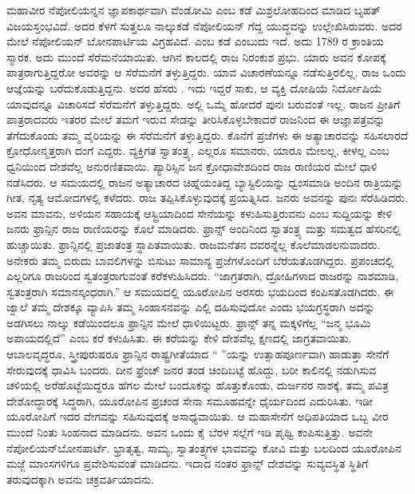 ಮಹಾವೀರ ನೆಪೋಲಿಯನ್ನನ ಜ್ಞಾಪಕಾರ್ಥವಾಗಿ ವೆಂಡೋಮಿ ಎಂಬ ಕಡೆ ಮಿಶ್ರ\break ಲೋಹದಿಂದ ಮಾಡಿದ ಬೃಹತ್​ ವಿಜಯಸ್ತಂಭವಿದೆ. ಅದರ ಕೆಳಗೆ ಸುತ್ತಲೂ ನಾಲ್ಕುಕಡೆ ನೆಪೋಲಿಯನ್​ ಗೆದ್ದ ಯುದ್ಧವನ್ನು ಉಲ್ಲೇಖಿಸಿರುವರು. ಅದರ ಮೇಲೆ ನೆಪೋಲಿಯನ್​ ಬೋನಪಾರ್ಟಿಯ ವಿಗ್ರಹವಿದೆ.  ಎಂಬ ಕಡೆ  ಎಂಬುದು ಇದೆ. ಅದು 1789 ರ ಕ್ರಾಂತಿಯ ಸ್ಮಾರಕ. ಅದು ಮುಂದೆ ಸೆರೆಮನೆಯಾಯಿತು. ಆಗಿನ ಕಾಲದಲ್ಲಿ ರಾಜ ನಿರಂಕುಶ ಪ್ರಭು. ಯಾರು ಅವನ ಕೋಪಕ್ಕೆ ಪಾತ್ರರಾಗುತ್ತಿದ್ದರೋ ಅವರನ್ನು ಆ ಸೆರೆಮನೆಗೆ ತಳ್ಳುತ್ತಿದ್ದರು. ಯಾವ ವಿಚಾರಣೆಯನ್ನೂ ನಡೆಸುತ್ತಿರಲಿಲ್ಲ. ರಾಜ ಒಂದು ಆಜ್ಞೆಯನ್ನು ಬರೆದುಕೊಡುತ್ತಿದ್ದನು. ಅದರ ಹೆಸರು . ಇದು ಇದ್ದರೆ ಸಾಕು, ಆ ವ್ಯಕ್ತಿ ದೋಷಿಯೆ ನಿರ್ದೋಷಿಯೆ ಯಾವುದನ್ನೂ ವಿಚಾರಿಸದೆ ಸೆರೆಮನೆಗೆ ತಳ್ಳುತ್ತಿದ್ದರು. ಅಲ್ಲಿ ಒಮ್ಮೆ ಹೋದರೆ ಪುನಃ ಬರುವಂತೆ ಇಲ್ಲ. ರಾಜನ ಪ್ರೀತಿಗೆ ಪಾತ್ರರಾದವರು ಇತರರ ಮೇಲೆ ತಮಗೆ ಇರುವ ಸೇಡನ್ನು ತೀರಿಸಿಕೊಳ್ಳಬೇಕಾದರೆ ರಾಜನಿಂದ ಈ ಆಜ್ಞಾಪತ್ರವನ್ನು ತೆಗೆದುಕೊಂಡು ತಮ್ಮ ವೈರಿಯನ್ನು ಈ ಸೆರೆಮನೆಗೆ ತಳ್ಳುತ್ತಿದ್ದರು. ಕೊನೆಗೆ ಪ್ರಜೆಗಳು ಈ ಅತ್ಯಾಚಾರವನ್ನು ಸಹಿಸಲಾರದೆ ಕ್ರೋಧೋನ್ಮತ್ತರಾಗಿ ದಂಗೆ ಎದ್ದರು. ವ್ಯಕ್ತಿಗತ ಸ್ವಾತಂತ್ರ್ಯ, ಎಲ್ಲರೂ ಸಮಾನರು, ಯಾರೂ ಮೇಲಲ್ಲ, ಕೀಳಲ್ಲ ಎಂಬ ಧ್ವನಿಯಿಂದ ದೇಶವೆಲ್ಲ ಅನುರಣಿತವಾಯಿ. ಪ್ಯಾರಿಸ್ಸಿನ ಜನ ಕ್ರೋಧಾವೇಶದಿಂದ ರಾಜ ರಾಣಿಯರ ಮೇಲೆ ಧಾಳಿ ನಡೆಸಿದರು. ಆ ಸಮಯದಲ್ಲಿ ರಾಜನ ಅತ್ಯಾಚಾರದ ಚಿಹ್ನೆಯಂತಿದ್ದ ಬ್ಯಾಸ್ಟಿಲಿಯನ್ನು ಧ್ವಂಸಮಾಡಿ ಅಂದಿನ ರಾತ್ರಿಯನ್ನು ಗೀತ, ನೃತ್ಯ ಆಮೋದಗಳಲ್ಲಿ ಕಳೆದರು. ರಾಜ ತಪ್ಪಿಸಿಕೊಳ್ಳುವುದಕ್ಕೆ ಪ್ರಯತ್ನಿಸಿದ. ಜನರು ಅವನನ್ನು ಪುನಃ ಸೆರೆಹಿಡಿದರು. ಅವನ ಮಾವನು, ಅಳಿಯನ ಸಹಾಯಕ್ಕೆ ಆಸ್ಟ್ರಿಯಾದಿಂದ ಸೇನೆಯನ್ನು ಕಳುಹಿಸುತ್ತಿರುವನು ಎಂಬ ಸುದ್ದಿಯನ್ನು ಕೇಳಿ ಜನರು ಫ್ರಾನ್ಸಿನ ರಾಜ ರಾಣಿಯರನ್ನು ಕೊಲೆ ಮಾಡಿದರು. ಫ್ರಾನ್ಸ್​ ಅಂದಿನಿಂದ ಸ್ವಾತಂತ್ರ್ಯ ಮತ್ತು ಸಮತ್ವದ ಹೆಸರಿನಲ್ಲಿ ಹುಚ್ಚಾಯಿತು. ಫ್ರಾನ್ಸಿನಲ್ಲಿ ಪ್ರಜಾತಂತ್ರ ಸ್ಥಾಪಿತವಾಯಿತು. ರಾಜಮನೆತನ ದವರನ್ನೆಲ್ಲ ಕೊಲೆಮಾಡಲನುವಾದರು. ಅನೇಕರು ತಮ್ಮ ಬಿರುದು ಬಾವಲಿಗಳನ್ನು ಬಿಸುಟು ಸಾಮಾನ್ಯ ಪ್ರಜೆಗಳೊಂದಿಗೆ ಬೆರೆಯತೊಡಗಿದ್ದರು. ಪ್ರಪಂಚದಲ್ಲಿ ಎಲ್ಲರಿಗೂ ರಾಜರಿಂದ ಸ್ವತಂತ್ರರಾಗುವಂತೆ ಕರೆಕಳುಹಿಸಿದರು. “ಜಾಗ್ರತರಾಗಿ, ದ್ರೋಹಿಗಳಾದ ರಾಜರನ್ನು ನಾಶಮಾಡಿ, ಸ್ವತಂತ್ರರಾಗಿ ಸಮಾನಸ್ಕಂಧರಾಗಿ.” ಆ ಸಮಯದಲ್ಲಿ ಯೂರೋಪಿನ ಅರಸರು ಭಯದಿಂದ ಕಂಪಿಸತೊಡಗಿದರು. ಈ ಜ್ವಾಲೆ ತಮ್ಮ ದೇಶಕ್ಕೂ ವ್ಯಾಪಿಸಿ ತಮ್ಮ ಸಿಂಹಾಸನವನ್ನು ಎಲ್ಲಿ ದಹಿಸುವುದೋ ಎಂದು ಭಯಗ್ರಸ್ಥರಾಗಿ ಅದನ್ನು ಅಡಗಿಸಲು ನಾಲ್ಕು ಕಡೆಯಿಂದಲೂ ಫ್ರಾನ್ಸಿನ ಮೇಲೆ ಧಾಳಿಯಿಟ್ಟರು. ಫ್ರಾನ್ಸ್​ ತನ್ನ ಮಕ್ಕಳಿಗೆಲ್ಲ “ಜನ್ಮ ಭೂಮಿ ಅಪಾಯದಲ್ಲಿದೆ” ಎಂಬ ಕರೆ ಕಳುಹಿಸಿತು. ಈ ಕರೆಯನ್ನು ಕೇಳಿ ದೇಶವೆಲ್ಲ ಕ್ಷಣದಲ್ಲಿ ಜಾಗ್ರತವಾಯಿತು. ಆಬಾಲವೃದ್ಧರೂ, ಸ್ತ್ರೀಪುರುಷರೂ ಫ್ರಾನ್ಸಿನ ರಾಷ್ಟ್ರಗೀತೆಯಾದ “ ”ಯನ್ನು ಉತ್ಸಾಹಪೂರ್ಣವಾಗಿ ಹಾಡುತ್ತಾ ಸೇನೆಗೆ ಸೇರುವುದಕ್ಕೆ ಧಾವಿಸಿ ಬಂದರು. ದೀನ ಫ್ರೆಂಚ್​ ಜನರ ತಂಡ ಚಿಂದಿಬಟ್ಟೆ ಹೊದ್ದು, ಬರೀ ಕಾಲಿನಲ್ಲಿ ನಡುಗಿಸುವ ಚಳಿಯಲ್ಲಿ ಅರೆಹೊಟ್ಟೆಯಿದ್ದರೂ ಹೆಗಲ ಮೇಲೆ ಬಂದೂಕನ್ನು ಹೊತ್ತುಕೊಂಡು, ದುರ್ಜನರ ನಾಶಕ್ಕೆ, ತಮ್ಮ ಪವಿತ್ರ ದೇಶೋದ್ಧಾರಕ್ಕೆ ಸಿದ್ಧರಾಗಿ, ಯೂರೋಪಿನ ಪ್ರಚಂಡ ಸೇನಾ ಸಮೂಹವನ್ನೇ ಧೈರ್ಯದಿಂದ ಎದುರಿಸಿತು. ಇಡೀ ಯೂರೋಪಿಗೆ ಇದರ ವೇಗವನ್ನು ಸಹಿಸುವುದಕ್ಕೆ ಅಸಾಧ್ಯವಾಯಿತು. ಆ ಮಹಾಸೇನೆಗೆ ಅಧಿಪತಿಯಾದ ಒಬ್ಬ ವೀರ ಮುಂದೆ ನಿಂತು ಸಿಂಹನಾದ ಮಾಡಿದನು. ಅವನ ಒಂದು ಕೈ ಬೆರಳ ಸಲ್ಲೆಗೆ ಇಡಿ ಪೃಥ್ವಿ ಕಂಪಿಸುತ್ತಿತ್ತು. ಅವನೇ ನೆಪೋಲಿಯನ್​ ಬೋನಪಾರ್ಟೆ. ಭ್ರಾತೃತ್ವ, ಸಾಮ್ಯ, ಸ್ವಾತಂತ್ರ್ಯಗಳ ಭಾವವನ್ನು ಕೋವಿ ಮತ್ತು ಬಲದಿಂದ ಯೂರೋಪಿನ ಮಜ್ಜೆ ಮಾಂಸಗಳಿಗೂ ಪ್ರವೇಶಿಸುವಂತೆ ಮಾಡಿದನು. ಇದಾದ ನಂತರ ಫ್ರಾನ್ಸ್​ ದೇಶವನ್ನು ಸುವ್ಯವಸ್ಥಿತ ಸ್ಥಿತಿಗೆ ತರುವುದಕ್ಕಾಗಿ ಅವನು ಚಕ್ರವರ್ತಿಯಾದನು.

